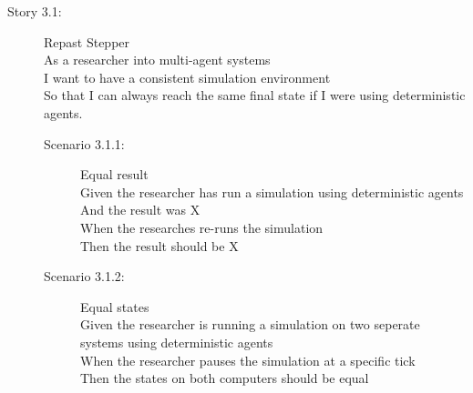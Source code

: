 \begin{description}
\item[Story 3.1:] Repast Stepper\\
As a researcher into multi-agent systems\\
I want to have a consistent simulation environment\\
So that I can always reach the same final state  if I were using \gls{deterministic} agents.

\begin{description}
\item[Scenario 3.1.1:] Equal result\\
Given the researcher has run a simulation using deterministic agents\\
And the result was X\\
When the researches re-runs the simulation\\
Then the result should be X

\item[Scenario 3.1.2:] Equal states\\
Given the researcher is running a simulation on two seperate systems using deterministic agents\\
When the researcher pauses the simulation at a specific tick\\
Then the states on both computers should be equal
\end{description}
\end{description}



